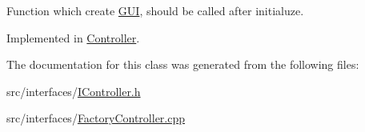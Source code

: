 Function which create \hyperlink{class_g_u_i}{G\+U\+I}, should be called after initialuze. 



Implemented in \hyperlink{class_controller_a01231af4ac9630c21fa7b8eb358b9c66}{Controller}.



The documentation for this class was generated from the following files\+:\begin{DoxyCompactItemize}
\item 
src/interfaces/\hyperlink{_i_controller_8h}{I\+Controller.\+h}\item 
src/interfaces/\hyperlink{_factory_controller_8cpp}{Factory\+Controller.\+cpp}\end{DoxyCompactItemize}
